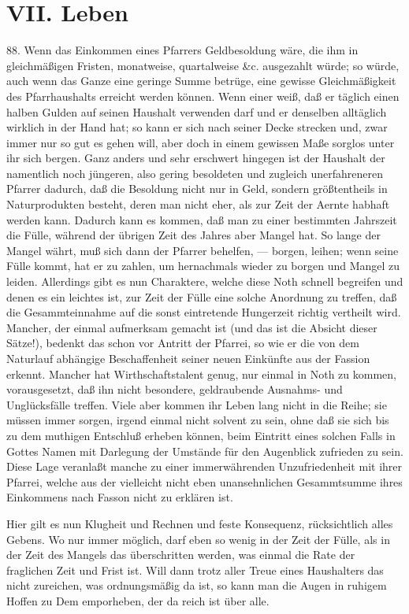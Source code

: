 \section{VII. Leben}

88. Wenn das Einkommen eines Pfarrers Geldbesoldung wäre, die ihm in gleichmäßigen Fristen, monatweise, quartalweise \&c. ausgezahlt würde; so würde, auch wenn das Ganze eine geringe Summe betrüge, eine gewisse Gleichmäßigkeit des Pfarrhaushalts erreicht werden können. Wenn einer weiß, daß er täglich einen halben
Gulden auf seinen Haushalt verwenden darf und er denselben alltäglich wirklich in der Hand hat; so kann er sich nach seiner Decke strecken und, zwar immer nur so gut es gehen will, aber doch in einem gewissen Maße sorglos unter ihr sich bergen. Ganz anders und sehr erschwert hingegen ist der Haushalt der namentlich noch jüngeren, also gering besoldeten und zugleich unerfahreneren Pfarrer dadurch, daß die Besoldung nicht nur in Geld, sondern größtentheils in Naturprodukten besteht, deren man nicht eher, als zur Zeit der Aernte habhaft werden kann. Dadurch kann es kommen, daß man zu einer bestimmten Jahrszeit die Fülle, während der übrigen Zeit des Jahres aber Mangel hat. So lange der Mangel währt, muß sich dann der Pfarrer behelfen, — borgen, leihen; wenn seine Fülle kommt, hat er zu zahlen, um hernachmals wieder zu borgen und Mangel zu leiden. Allerdings gibt es nun Charaktere, welche diese Noth schnell begreifen und denen es ein leichtes ist, zur Zeit der Fülle eine solche Anordnung zu treffen, daß die Gesammteinnahme auf die sonst eintretende Hungerzeit richtig vertheilt wird. Mancher, der einmal aufmerksam gemacht ist (und das ist die Absicht dieser Sätze!), bedenkt das schon vor Antritt der Pfarrei, so wie er die von dem Naturlauf abhängige Beschaffenheit seiner neuen Einkünfte aus der Fassion erkennt. Mancher hat Wirthschaftstalent genug, nur einmal in Noth zu kommen, vorausgesetzt, daß ihn nicht besondere, geldraubende Ausnahms- und Unglücksfälle treffen. Viele aber kommen ihr Leben lang nicht in die Reihe; sie müssen immer sorgen, irgend einmal nicht solvent zu sein, ohne daß sie sich
bis zu dem muthigen Entschluß erheben können, beim Eintritt eines solchen Falls in Gottes Namen mit Darlegung der Umstände für den Augenblick zufrieden zu sein. Diese Lage veranlaßt manche zu einer immerwährenden Unzufriedenheit mit ihrer Pfarrei, welche aus der vielleicht nicht eben unansehnlichen Gesammtsumme ihres Einkommens nach Fasson nicht zu erklären ist.

Hier gilt es nun Klugheit und Rechnen und feste Konsequenz, rücksichtlich alles Gebens. Wo nur immer möglich, darf eben so wenig in der Zeit der Fülle, als in der Zeit des Mangels das überschritten werden, was einmal die Rate der fraglichen Zeit und Frist ist. Will dann trotz aller Treue eines Haushalters das nicht zureichen, was ordnungsmäßig da ist, so kann man die Augen in ruhigem Hoffen zu Dem emporheben, der da reich ist über alle.

